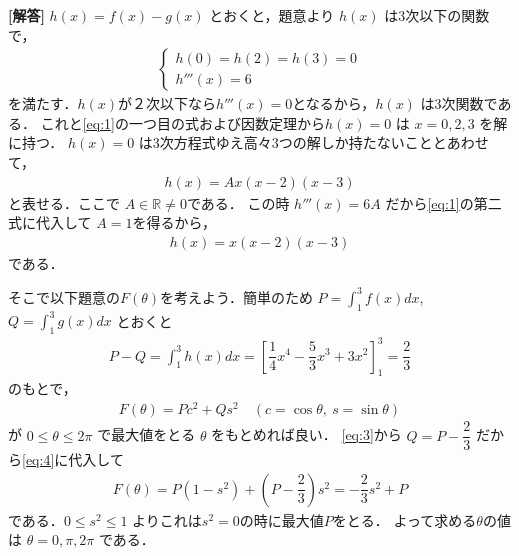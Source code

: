 \documentclass[../../main.tex]{subfiles}
\begin{document}
\begin{oframed}
  
\end{oframed}

{\bf [解答]}
$h(x) = f(x) - g(x)$ とおくと，題意より $h(x)$ は3次以下の関数で，
\begin{align}
  \begin{cases}
    h(0)=h(2)=h(3)=0 \\
    h'''(x) = 6
  \end{cases} \label{eq:1}
\end{align}
を満たす．$h(x)$が２次以下なら$h'''(x)=0$となるから，$h(x)$ は3次関数である．
これと\cref{eq:1}の一つ目の式および因数定理から$h(x)=0$ は $x=0,2,3$ を解に持つ．
$h(x)=0$ は3次方程式ゆえ高々3つの解しか持たないこととあわせて，
\begin{align}
  h(x) = Ax(x-2)(x-3)
\end{align}
と表せる．ここで $A\in\mathbb{R}\neq 0$である．
この時 $h'''(x)=6A$ だから\cref{eq:1}の第二式に代入して $A=1$を得るから，
\begin{align}
  h(x) = x(x-2)(x-3) \label{eq:2}
\end{align}
である．

そこで以下題意の$F(\theta)$を考えよう．簡単のため
$P=\displaystyle\int_1^3 f(x)dx$, $Q=\displaystyle\int_1^3 g(x)dx$ とおくと
\begin{align}
  P-Q = \int_1^3 h(x)dx = \left[\dfrac{1}{4}x^4-\dfrac{5}{3}x^3+3x^2\right]_1^3 = \dfrac{2}{3} \label{eq:3}
\end{align}
のもとで，
\begin{align}
  F(\theta) = Pc^2+Qs^2 \quad (c=\cos\theta,\ s=\sin\theta) \label{eq:4}
\end{align}
が $0 \le\theta\le 2\pi$ で最大値をとる $\theta$ をもとめれば良い．
\cref{eq:3}から $Q=P-\dfrac{2}{3}$ だから\cref{eq:4}に代入して
\begin{align}
  F(\theta) = P(1-s^2)+\left(P-\dfrac{2}{3}\right)s^2 = -\dfrac{2}{3}s^2+P
\end{align}
である．$0\le s^2\le 1$ よりこれは$s^2=0$の時に最大値$P$をとる．
よって求める$\theta$の値は $\theta=0,\pi,2\pi$ である．

\newpage
\end{document}
